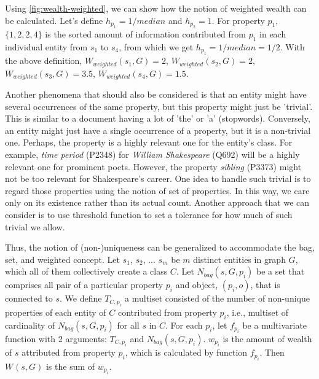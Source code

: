 Using \autoref{fig:wealth-weighted}, we can show how the notion of weighted wealth can be calculated. Let's define \(h_{p_1} = 1/median\) and \(h_{p_2} = 1\). For property \(p_1\), \(\{1, 2, 2, 4\}\) is the sorted amount of information contributed from \(p_1\) in each individual entity from \(s_1\) to \(s_4\), from which we get \(h_{p_1} = 1/median = 1/2\). With the above definition, \(W_{weighted}(s_1, G) = 2\), \(W_{weighted}(s_2, G) = 2\), \(W_{weighted}(s_3, G) = 3.5\), \(W_{weighted}(s_4, G) = 1.5\).

Another phenomena that should also be considered is that an entity might have several occurrences of the same property, but this property might just be 'trivial'. This is similar to a document having a lot of 'the' or 'a' (stopwords). Conversely, an entity might just have a single occurrence of a property, but it is a non-trivial one. Perhaps, the property is a highly relevant one for the entity's class. For example, \textit{time period} (P2348) for \textit{William Shakespeare} (Q692) will be a highly relevant one for prominent poets. However, the property \textit{sibling} (P3373) might not be too relevant for Shakespeare's career. One idea to handle such trivial is to regard those properties using the notion of set of properties. In this way, we care only on its existence rather than its actual count. Another approach that we can consider is to use threshold function to set a tolerance for how much of such trivial we allow.



Thus, the notion of (non-)uniqueness can be generalized to accommodate the bag, set, and weighted concept. Let \(s_1\), \(s_2\), ... \(s_m\) be \(m\) distinct entities in graph \(G\), which all of them collectively create a class \(C\). Let \(N_{bag}(s,G,p_i)\) be a set that comprises all pair of a particular property \(p_i\) and object, \((p_i,o)\), that is connected to \(s\). We define \(T_{C,p_i}\) a multiset consisted of the number of non-unique properties of each entity of \(C\) contributed from property \(p_i\), i.e., multiset of cardinality of \(N_{bag}(s,G,p_i)\) for all \(s\) in \(C\). For each \(p_i\), let \(f_{p_i}\) be a multivariate function with 2 arguments: \(T_{C,p_i}\) and \(N_{bag}(s,G,p_i)\). \(w_{p_i}\) is the amount of wealth of \(s\) attributed from property \(p_i\), which is calculated by function \(f_{p_i}\). Then \(W_{}(s, G)\) is the sum of \(w_{p_i}\).


